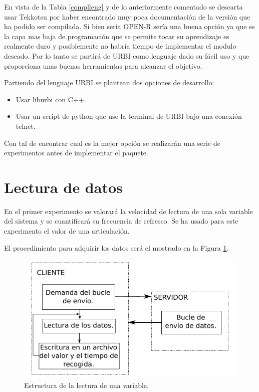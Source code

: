 \documentclass[12pt,a4paper,final,twoside]{book}
\begin{document}
En vista de la Tabla \ref{complleng} y de lo anteriormente comentado se descarta usar Tekkotsu por haber encontrado muy poca documentación de la versión que ha podido ser compilada. Si bien seria OPEN-R sería una buena opción ya que es la capa mas baja de programación que se permite tocar su aprendizaje es realmente duro y posiblemente no habría tiempo de implementar el modulo deseado. Por lo tanto se partirá de URBI como lenguaje dado su fácil uso y que proporciona unas buenas herramientas para alcanzar el objetivo.


Partiendo del lenguaje URBI se plantean dos opciones de desarrollo:
\begin{itemize}
\item Usar liburbi con C++.
\item Usar un script de python que use la terminal de URBI bajo una conexión telnet.
\end{itemize}

Con tal de encontrar cual es la mejor opción se realizarán una serie de experimentos antes de implementar el paquete. 

\section{Lectura de datos}\label{compenvio}
En el primer experimento se valorará la velocidad de lectura de una sola variable del sistema y se cuantificará su frecuencia de refresco. Se ha usado para este experimento el valor de una articulación.

El procedimiento para adquirir los datos será el mostrado en la Figura \ref{fig:readleg}.


\begin{figure}[h!]
	\centering
    \includegraphics[scale=1.4]{images/lectdata.pdf}
	 \caption{Estructura de la lectura de una variable.}
  \label{fig:readleg}
\end{figure}
\end{document}
